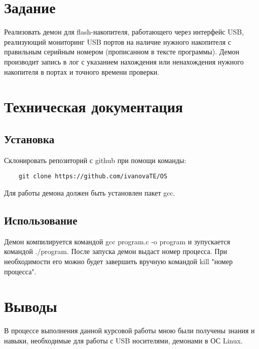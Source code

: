 \documentclass[12pt,a4paper]{scrartcl}
\begin{document}
\section{Задание}
	Реализовать демон для flash-накопителя, работающего через интерфейс USB, реализующий  мониторинг  USB портов на наличие нужного накопителя с правильным серийным номером (прописанном в тексте программы).  Демон производит запись в лог с указанием нахождения или ненахождения нужного накопителя в портах и точного времени проверки.
\section{Техническая документация}
\subsection{Установка}
	Склонировать репозиторий с github при помощи команды: \begin{verbatim}
	git clone https://github.com/ivanovaTE/OS
	\end{verbatim} Для работы демона должен быть установлен пакет gcc.
\subsection{Использование}
	Демон компилируется командой gcc program.c -o program и зупускается командой ./program. После запуска демон выдаст номер процесса. При необходимости его можно будет завершить вручную командой kill "номер процесса".
\section{Выводы}
	В процессе выполнения данной курсовой работы мною были получены знания и навыки, необходимые для работы с USB носителями, демонами в ОС Linux.
	\newpage
\end{document}
